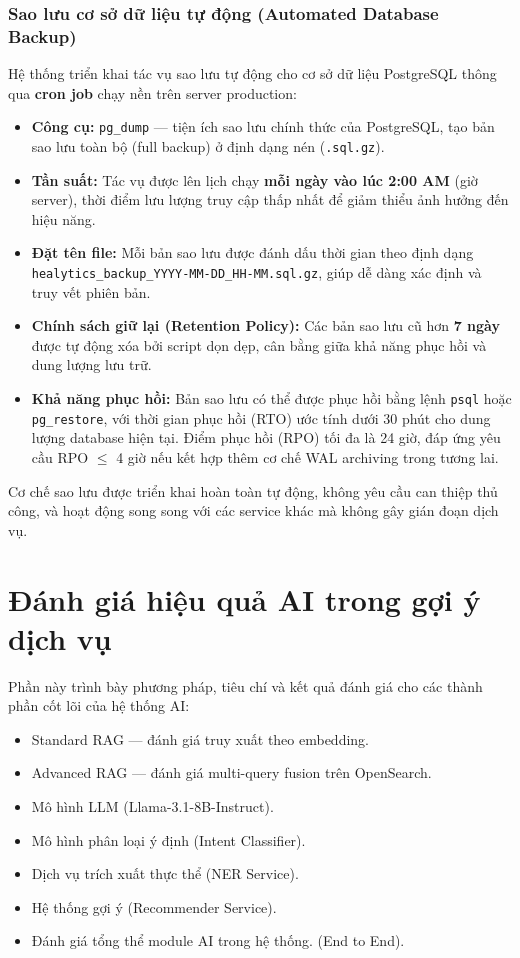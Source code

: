 \subsubsection{Sao lưu cơ sở dữ liệu tự động (Automated Database Backup)}

Hệ thống triển khai tác vụ sao lưu tự động cho cơ sở dữ liệu PostgreSQL thông qua \textbf{cron job} chạy nền trên server production:

\begin{itemize}
    \item \textbf{Công cụ:} \texttt{pg\_dump} --- tiện ích sao lưu chính thức của PostgreSQL, tạo bản sao lưu toàn bộ (full backup) ở định dạng nén (\texttt{.sql.gz}).
    \item \textbf{Tần suất:} Tác vụ được lên lịch chạy \textbf{mỗi ngày vào lúc 2:00 AM} (giờ server), thời điểm lưu lượng truy cập thấp nhất để giảm thiểu ảnh hưởng đến hiệu năng.
    \item \textbf{Đặt tên file:} Mỗi bản sao lưu được đánh dấu thời gian theo định dạng \texttt{healytics\_backup\_YYYY-MM-DD\_HH-MM.sql.gz}, giúp dễ dàng xác định và truy vết phiên bản.
    \item \textbf{Chính sách giữ lại (Retention Policy):} Các bản sao lưu cũ hơn \textbf{7 ngày} được tự động xóa bởi script dọn dẹp, cân bằng giữa khả năng phục hồi và dung lượng lưu trữ.
    \item \textbf{Khả năng phục hồi:} Bản sao lưu có thể được phục hồi bằng lệnh \texttt{psql} hoặc \texttt{pg\_restore}, với thời gian phục hồi (RTO) ước tính dưới 30 phút cho dung lượng database hiện tại. Điểm phục hồi (RPO) tối đa là 24 giờ, đáp ứng yêu cầu RPO $\leq$ 4 giờ nếu kết hợp thêm cơ chế WAL archiving trong tương lai.
\end{itemize}

Cơ chế sao lưu được triển khai hoàn toàn tự động, không yêu cầu can thiệp thủ công, và hoạt động song song với các service khác mà không gây gián đoạn dịch vụ.

\section{Đánh giá hiệu quả AI trong gợi ý dịch vụ}

Phần này trình bày phương pháp, tiêu chí và kết quả đánh giá cho các thành phần cốt lõi của hệ thống AI:
\begin{itemize}
    \item Standard RAG --- đánh giá truy xuất theo embedding.
    \item Advanced RAG --- đánh giá multi-query fusion trên OpenSearch.
    \item Mô hình LLM (Llama-3.1-8B-Instruct).
    \item Mô hình phân loại ý định (Intent Classifier).
    \item Dịch vụ trích xuất thực thể (NER Service).
    \item Hệ thống gợi ý (Recommender Service).
    \item Đánh giá tổng thể module AI trong hệ thống. (End to End).
\end{itemize}


